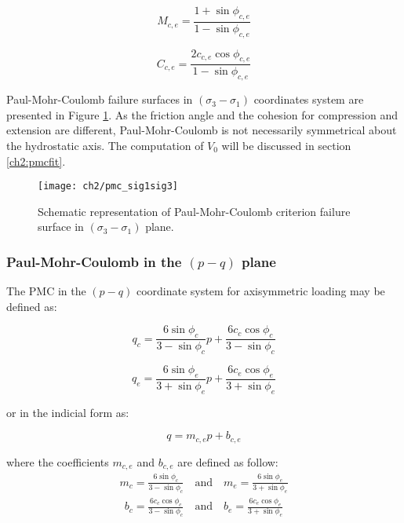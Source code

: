 \begin{equation}\label{eq2:PMC_sig1sig3_Mce}
    M_{c,e} = \frac{1+\sin \phi_{c,e}}{1-\sin \phi_{c,e}}
\end{equation}

\begin{equation}\label{eq2:PMC_sig1sig3_Cce}
    C_{c,e} = \frac{2c_{c,e}\cos \phi_{c,e}}{1-\sin \phi_{c,e}}
\end{equation}

Paul-Mohr-Coulomb failure surfaces in $(\sigma_3 -\sigma_1)$ coordinates system are presented in Figure \ref{fig2:pmc_sig1sig3}. As the friction angle and the cohesion for compression and extension are different, Paul-Mohr-Coulomb is not necessarily symmetrical about the hydrostatic axis. The computation of $V_0$ will be discussed in section \ref{ch2:pmcfit}. 

\begin{figure}[tb]
    \centering
    \texttt{[image: ch2/pmc\_sig1sig3]}
    \caption{Schematic representation of Paul-Mohr-Coulomb criterion failure surface in $(\sigma_3 -\sigma_1)$ plane.}
    \label{fig2:pmc_sig1sig3}
\end{figure} 

\subsubsection{Paul-Mohr-Coulomb in the \texorpdfstring{$(p-q)$}{p-q} plane}

The PMC in the $(p-q)$ coordinate system for axisymmetric loading may be defined as:

\begin{equation}\label{eq2:pmc-q-CTC}
    q_c=\frac{6 \sin \phi_{c}}{3-\sin \phi_{c}} p+\frac{6 c_{c} \cos \phi_{c}}{3-\sin \phi_{c}}
\end{equation}

\begin{equation}\label{eq2:pmc-q-CTE}
    q_e=\frac{6 \sin \phi_{e}}{3+\sin \phi_{e}} p+\frac{6 c_{e} \cos  \phi_{e}}{3+\sin \phi_{e}}
\end{equation}

or in the indicial form as:

\begin{equation}\label{eq2:PMC_pq}
    q = m_{c,e}p+b_{c,e}
\end{equation}

where the coefficients $m_{c,e}$ and $b_{c,e}$ are defined as follow:
\begin{align}\label{eq2:pmc_m_pq}
    m_c=\frac{6 \sin \phi_{c}}{3-\sin \phi_{c}} \quad \textrm{and} \quad m_e=\frac{6 \sin \phi_{e}}{3+\sin \phi_{e}} 
\end{align}
\begin{align}\label{eq2:pmc_b_pq}
    b_c=\frac{6 c_{c} \cos \phi_{c}}{3-\sin \phi_{c}}\quad \textrm{and} \quad b_e=\frac{6 c_{e} \cos \phi_{e}}{3+\sin \phi_{e}}
\end{align}


